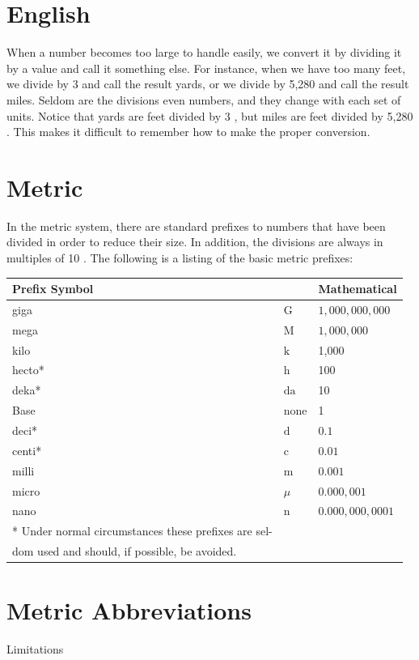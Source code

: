 \documentclass[10pt]{article}
\begin{document}
\section{English}
When a number becomes too large to handle easily, we convert it by dividing it by a value and call it something else. For instance, when we have too many feet, we divide by 3 and call the result yards, or we divide by 5,280 and call the result miles. Seldom are the divisions even numbers, and they change with each set of units. Notice that yards are feet divided by 3 , but miles are feet divided by 5,280 . This makes it difficult to remember how to make the proper conversion.

\section{Metric}
In the metric system, there are standard prefixes to numbers that have been divided in order to reduce their size. In addition, the divisions are always in multiples of 10 . The following is a listing of the basic metric prefixes:

\begin{tabular}{|l|l|l|}
\hline
\multicolumn{2}{|l|}{Prefix Symbol} & \multicolumn{1}{l|}{Mathematical} \\
\hline
giga & $\mathrm{G}$ & $1,000,000,000$ \\
mega & $\mathrm{M}$ & $1,000,000$ \\
kilo & $\mathrm{k}$ & 1,000 \\
hecto* & $\mathrm{h}$ & 100 \\
deka* & $\mathrm{da}$ & 10 \\
Base & none & 1 \\
deci* & $\mathrm{d}$ & $0.1$ \\
centi* & $\mathrm{c}$ & $0.01$ \\
milli & $\mathrm{m}$ & $0.001$ \\
micro & $\mu$ & $0.000,001$ \\
nano & $\mathrm{n}$ & $0.000,000,0001$ \\
\hline
* Under normal circumstances these prefixes are sel- &  &  \\
dom used and should, if possible, be avoided. &  &  \\
\hline
\end{tabular}

\section{Metric Abbreviations}
Limitations
\end{document}
